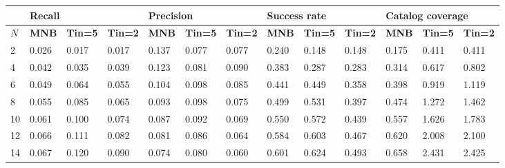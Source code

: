 \begin{table*}[]
	\small
\begin{tabular}{|l | lll| lll |lll |lll|}
	\hline
	& \multicolumn{3}{l|}{\textbf{Recall}} & \multicolumn{3}{l|}{\textbf{Precision}} & \multicolumn{3}{l|}{\textbf{Success rate}} & \multicolumn{3}{l|}{ \textbf{Catalog coverage}} \\ \hline
	$N$  & \textbf{MNB}     & \textbf{Tin=5}   & \textbf{Tin=2}  & \textbf{MNB}      & \textbf{Tin=5 }   & \textbf{Tin=2}   & \textbf{MNB}       & \textbf{Tin=5 }   & \textbf{Tin=2}    & \textbf{MNB}        & \textbf{Tin=5 }     & \textbf{Tin=2}      \\ \hline
                   
2                  & 0.026 & 0.017             & 0.017             & 0.137 & 0.077             & 0.077             & 0.240 & 0.148             & 0.148             & 0.175 & 0.411             & 0.411             \\ \hline
4                  & 0.042 & 0.035             & 0.039             & 0.123 & 0.081             & 0.090             & 0.383 & 0.287             & 0.283             & 0.314 & 0.617             & 0.802             \\ \hline
6                  & 0.049 & 0.064             & 0.055             & 0.104 & 0.098             & 0.085             & 0.441 & 0.449             & 0.358             & 0.398 & 0.919             & 1.119             \\ \hline
\rowcolor{Gray}
8                  & 0.055 & 0.085             & 0.065             & 0.093 & 0.098             & 0.075             & 0.499 & 0.531             & 0.397             & 0.474 & 1.272             & 1.462             \\ \hline
10                 & 0.061 & 0.100             & 0.074             & 0.087 & 0.092             & 0.069             & 0.550 & 0.572             & 0.439             & 0.557 & 1.626             & 1.783             \\ \hline
12                 & 0.066 & 0.111             & 0.082             & 0.081 & 0.086             & 0.064             & 0.584 & 0.603             & 0.467             & 0.620 & 2.008             & 2.100             \\ \hline
14                 & 0.067 & 0.120             & 0.090             & 0.074 & 0.080             & 0.060             & 0.601 & 0.624             & 0.493             & 0.658 & 2.431             & 2.425             \\ \hline

\end{tabular}
\end{table*}
